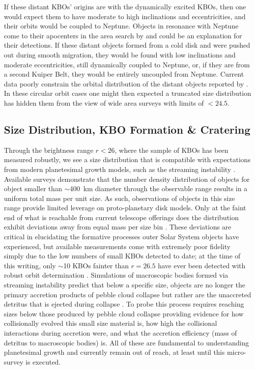 \documentclass[modern,preprint]{aastex7}
\begin{document}
If these distant KBOs' origins are with the dynamically excited KBOs, then one would expect them to have moderate to high inclinations and eccentricities, and their orbits would be coupled to Neptune. 
Objects in resonance with Neptune come to their apocenters in the area search by \citet{Fraser2024PSJ} and could be an explanation for their detections. 
If these distant objects formed from a cold disk and were pushed out during smooth migration, they would be found with low inclinations and moderate eccentricities, still dynamically coupled to Neptune, or, if they are from a second Kuiper Belt, they would be entirely uncoupled from Neptune. Current data poorly constrain the orbital distribution of the distant objects reported by \citet{Fraser2024PSJ}.  
In these circular orbit cases one might then expected a truncated size distribution has hidden them from the view of wide area surveys with limits of $<24.5$.

\subsection{Size Distribution, KBO Formation \& Cratering} 
Through the brightness range $r<26$, where the sample of KBOs has been measured robustly, we see a size distribution that is compatible with expectations from modern planetesimal growth models, such as the streaming instability \citep{Kavelaars2021, Petit2023, Napier2023}. 
Available surveys demonstrate that the number density distribution of objects for object smaller than $\sim$400~km diameter through the observable range results in a uniform total mass per unit size. 
As such, observations of objects in this size range provide limited leverage on proto-planetary disk models. 
Only at the faint end of what is reachable from current telescope offerings does the distribution exhibit deviations away from equal mass per size bin \citep{Napier2023}. 
These deviations are critical in elucidating the formative processes outer Solar System objects have experienced, but available measurements come with extremely poor fidelity simply due to the low numbers of small KBOs detected to date; at the time of this writing, only $\sim$10 KBOs fainter than $r=26.5$ have ever been detected with robust orbit determination \citep{Bernstein2004, Smotherman2024}. 
Simulations of macroscopic bodies formed via streaming instability predict that below a specific size, objects are no longer the primary accretion products of pebble cloud collapse but rather are the unaccreted detritus that is ejected during collapse \citep[e.g.,][]{Robinson2020, Polak2023}. 
To probe this process requires reaching sizes below those produced by pebble cloud collapse providing evidence for how collisionally evolved this small size material is, how high the collisional interactions during accretion were, and what the accretion efficiency (mass of detritus to macroscopic bodies) is. 
All of these are fundamental to understanding planetesimal growth and currently remain out of reach, at least until this micro-survey is executed.
\end{document}
